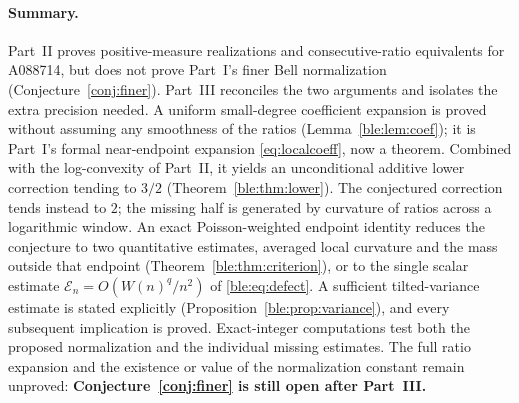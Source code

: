 \documentclass[11pt]{article}
\numberwithin{equation}{section}
\theoremstyle{definition}
\theoremstyle{remark}
\begin{document}
\paragraph{Summary.}
Part~II proves positive-measure realizations and consecutive-ratio
equivalents for A088714, but does not prove Part~I's finer Bell
normalization (Conjecture~\ref{conj:finer}). Part~III reconciles the two
arguments and isolates the extra precision needed. A uniform small-degree
coefficient expansion is proved without assuming any smoothness of the
ratios (Lemma~\ref{ble:lem:coef}); it is Part~I's formal near-endpoint
expansion \eqref{eq:localcoeff}, now a theorem. Combined with the
log-convexity of Part~II, it yields an unconditional additive lower
correction tending to $3/2$ (Theorem~\ref{ble:thm:lower}). The
conjectured correction tends instead to $2$; the missing half is
generated by curvature of ratios across a logarithmic window. An exact
Poisson-weighted endpoint identity reduces the conjecture to two
quantitative estimates, averaged local curvature and the mass outside that
endpoint (Theorem~\ref{ble:thm:criterion}), or to the single scalar
estimate $\mathcal E_n=O(W(n)^q/n^2)$ of \eqref{ble:eq:defect}. A
sufficient tilted-variance estimate is stated explicitly
(Proposition~\ref{ble:prop:variance}), and every subsequent implication is
proved. Exact-integer computations test both the proposed normalization
and the individual missing estimates. The full ratio expansion and the
existence or value of the normalization constant remain unproved:
\textbf{Conjecture~\ref{conj:finer} is still open after Part~III.}
\end{document}
